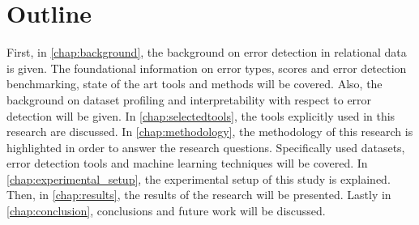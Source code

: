 \section{Outline}
\label{sec:outline}
First, in \autoref{chap:background}, the background on error detection in relational data is given. The foundational information on error types, scores and error detection benchmarking, state of the art tools and methods will be covered. Also, the background on dataset profiling and interpretability with respect to error detection will be given. 
In \autoref{chap:selectedtools}, the tools explicitly used in this research are discussed.
In \autoref{chap:methodology}, the methodology of this research is highlighted in order to answer the research questions. Specifically used datasets, error detection tools and machine learning techniques will be covered. 
In \autoref{chap:experimental_setup}, the experimental setup of this study is explained.
Then, in \autoref{chap:results}, the results of the research will be presented. 
Lastly in \autoref{chap:conclusion}, conclusions and future work will be discussed.